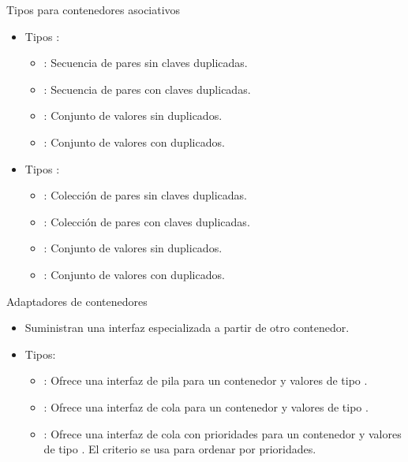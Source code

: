 \begin{frame}[t]{Tipos para contenedores asociativos}
\vspace{-1em}
\begin{itemize}
  \item Tipos :
    \begin{itemize}
      \item {}: Secuencia de pares  sin claves duplicadas.
      \item {}: Secuencia de pares  con claves duplicadas.
      \item {}: Conjunto de valores  sin duplicados.
      \item {}: Conjunto de valores  con duplicados.
    \end{itemize}
  \vfill\pause
  \item Tipos :
    \begin{itemize}
      \item {}: Colección de pares  sin claves duplicadas.
      \item {}: Colección de pares  con claves duplicadas.
      \item {}: Conjunto de valores  sin duplicados.
      \item {}: Conjunto de valores  con duplicados.
    \end{itemize}
\end{itemize}
\end{frame}

\begin{frame}[t]{Adaptadores de contenedores}
\begin{itemize}
  \item Suministran una interfaz especializada a partir de otro contenedor.
  \item Tipos:
    \begin{itemize}
      \item {}: Ofrece una interfaz de pila para un contenedor  y 
            valores de tipo .
      \item {}: Ofrece una interfaz de cola para un contenedor  y 
            valores de tipo .
      \item {}: Ofrece una interfaz de cola con prioridades 
            para un contenedor  y valores de tipo . El criterio 
            se usa para ordenar por prioridades.
    \end{itemize}
\end{itemize}
\end{frame}

